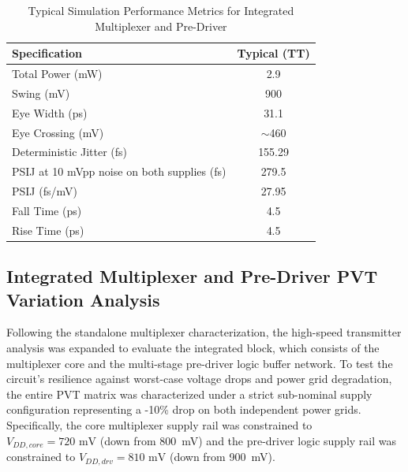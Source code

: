 \begin{table}[H]
    \centering
    \renewcommand{\arraystretch}{1.3}
    \setlength{\tabcolsep}{14pt}
    \begin{tabular}{|l|c|}
        \hline
        Specification & Typical (TT) \\ \hline
        Total Power (mW) & 2.9 \\ \hline
        Swing (mV) & 900 \\ \hline
        Eye Width (ps) & 31.1 \\ \hline
        Eye Crossing (mV) & $\sim$460 \\ \hline
        Deterministic Jitter (fs) & 155.29 \\ \hline
        PSIJ at 10 mVpp noise on both supplies (fs) & 279.5 \\ \hline
        PSIJ (fs/mV) & 27.95 \\ \hline
        Fall Time (ps) & 4.5 \\ \hline
        Rise Time (ps) & 4.5 \\ \hline
    \end{tabular}
    \vspace{2mm}
    \caption{Typical Simulation Performance Metrics for Integrated Multiplexer and Pre-Driver}
    \label{tab:mux_predriver_tt_baseline}
\end{table}

\clearpage

\subsection{Integrated Multiplexer and Pre-Driver PVT Variation Analysis}
\label{subsec:mux_predriver_corners}

Following the standalone multiplexer characterization, the high-speed transmitter analysis was expanded to evaluate the integrated block, which consists of the multiplexer core and the multi-stage pre-driver logic buffer network. To test the circuit's resilience against worst-case voltage drops and power grid degradation, the entire PVT matrix was characterized under a strict sub-nominal supply configuration representing a -10\% drop on both independent power grids. Specifically, the core multiplexer supply rail was constrained to $V_{DD,core} = 720\text{ mV}$ (down from 800~mV) and the pre-driver logic supply rail was constrained to $V_{DD,drv} = 810\text{ mV}$ (down from 900~mV). 

